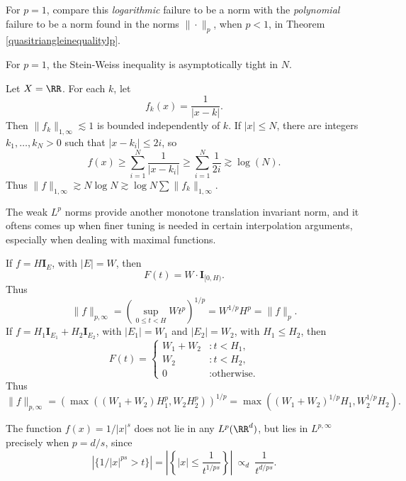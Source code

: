 \begin{remark}
  For $p = 1$, compare this \emph{logarithmic} failure to be a norm with the \emph{polynomial} failure to be a norm found in the norms $\| \cdot \|_p$, when $p < 1$, in Theorem \ref{quasitriangleinequalitylp}.
\end{remark}

For $p = 1$, the Stein-Weiss inequality is asymptotically tight in $N$.

\begin{example}
  Let $X = \RR$. For each $k$, let
  \[ f_k(x) = \frac{1}{|x - k|}. \]
  Then $\| f_k \|_{1,\infty} \lesssim 1$ is bounded independently of $k$. If $|x| \leq N$, there are integers $k_1, \dots, k_N > 0$ such that $|x - k_i| \leq 2i$, so
  \[ f(x) \geq \sum_{i = 1}^N \frac{1}{|x - k_i|} \geq \sum_{i = 1}^N \frac{1}{2i} \gtrsim \log(N). \]
  Thus $\| f \|_{1,\infty} \gtrsim N \log N \gtrsim \log N \sum \| f_k \|_{1,\infty}$.
\end{example}

The weak $L^p$ norms provide another monotone translation invariant norm, and it oftens comes up when finer tuning is needed in certain interpolation arguments, especially when dealing with maximal functions.

\begin{example}
  If $f = H \mathbf{I}_E$, with $|E| = W$, then
  \[ F(t) = W \cdot \mathbf{I}_{[0,H)}. \]
  Thus
  \[ \| f \|_{p,\infty} = \left( \sup_{0 \leq t < H} W t^p \right)^{1/p} = W^{1/p} H^p = \| f \|_p. \]
  If $f = H_1 \mathbf{I}_{E_1} + H_2 \mathbf{I}_{E_2}$, with $|E_1| = W_1$ and $|E_2| = W_2$, with $H_1 \leq H_2$, then
  \[ F(t) = \begin{cases} W_1 + W_2 &: t < H_1, \\ W_2 &: t < H_2, \\ 0 &: \text{otherwise.} \end{cases} \]
  Thus
  \[ \| f \|_{p,\infty} = \left( \max((W_1 + W_2) H_1^p, W_2 H_2^p) \right)^{1/p} = \max((W_1 + W_2)^{1/p} H_1, W_2^{1/p} H_2). \]
\end{example}

\begin{example}
    The function $f(x) = 1/|x|^s$ does not lie in any $L^p(\RR^d)$, but lies in $L^{p,\infty}$ precisely when $p = d/s$, since
    \[ \left| \{ 1/|x|^{ps} > t \} \right| = \left| \left\{ |x| \leq \frac{1}{t^{1/ps}} \right\} \right|\ \propto_d\ \frac{1}{t^{d/ps}}. \]
\end{example}

